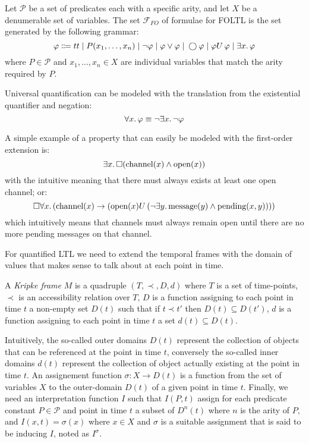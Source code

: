 \begin{definition}\label{def:kripkefoltlsyn}
  Let $\mathcal{P}$ be a set of predicates each with a specific arity, and let $X$ be a denumerable set of variables.
  The set $\mathcal{F}_{FO}$ of formulae for \ac{FOLTL} is the set generated by the following grammar:
  \[
    \varphi \Coloneqq tt \;|\; P(x_1, \ldots, x_n)
                      \;|\; \neg\varphi
                      \;|\; \varphi \lor \varphi
                      \;|\; \bigcirc{\varphi}
                      \;|\; {\varphi}U\,{\varphi}
                      \;|\; \exists {x} \ldotp {\varphi}
  \]
  where $P \in \mathcal{P}$ and $x_1, \ldots, x_n \in X$ are individual variables that match the arity required by $P$.
\end{definition}
Universal quantification can be modeled with the translation from the existential quantifier and negation:
\[
  \forall {x} \ldotp {\varphi} \equiv \neg\exists {x} \ldotp {\neg\varphi}
\]

A simple example of a property that can easily be modeled with the first-order extension is:
\[
  \exists {x} \ldotp {\Box{(\text{channel}(x) \land \text{open}(x))}}
\]
with the intuitive meaning that there must always exists at least one open channel; or:
\[
  \Box{\forall {x} \ldotp {(\text{channel}(x)} \to ({\text{open}(x)}U\,{(\neg\exists {y} \ldotp {\text{message}(y) \land \text{pending}(x, y)})}))}
\]
which intuitively means that channels must always remain open until there are no more pending messages on that channel.

For quantified LTL we need to extend the temporal frames with the domain of values that makes sense to talk about at
each point in time.

\begin{definition}
  A \emph{Kripke frame} $M$ is a quadruple $(T, \prec, D, d)$ where $T$ is a set of time-points, $\prec$ is an
  accessibility relation over $T$, $D$ is a function assigning to each point in time $t$ a non-empty set $D(t)$ such that
  if $t \prec t'$ then $D(t) \subseteq D(t')$, $d$ is a function assigning to each point in time $t$ a set $d(t)
  \subseteq D(t)$.
\end{definition}
Intuitively, the so-called outer domains $D(t)$ represent the collection of objects that can be referenced at the point
in time $t$, conversely the so-called inner domains $d(t)$ represent the collection of object actually existing at the
point in time $t$. An assignement function $\sigma : X \to D(t)$ is a function from the set of variables $X$ to the outer-domain
$D(t)$ of a given point in time $t$. Finally, we need an interpretation function $I$ such that $I(P, t)$ assign for each
predicate constant $P \in \mathcal{P}$ and point in time $t$ a subset of $D^n(t)$ where $n$ is the arity of $P$, and
$I(x, t) = \sigma(x)$ where $x \in X$ and $\sigma$ is a suitable assignment that is said to be inducing $I$, noted as
$I^\sigma$.

